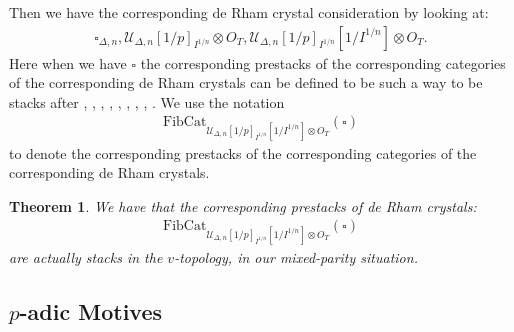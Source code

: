 \documentclass[12pt]{article}
\newtheorem{theorem}{Theorem}
\theoremstyle{definition}
\begin{document}
Then we have the corresponding de Rham crystal consideration by looking at:
\begin{align}
\square_{\Delta,n},\mathcal{U}_{\Delta,n}[1/p]_{I^{1/n}}\otimes {O}_T, \mathcal{U}_{\Delta,n}[1/p]_{I^{1/n}}[1/I^{1/n}]\otimes {O}_T. 
\end{align} 
Here when we have $\square$ the corresponding prestacks of the corresponding categories of the corresponding de Rham crystals can be defined to be such a way to be stacks after \cite{CSA}, \cite{CSB}, \cite{CSC}, \cite{SchD}, \cite{SALBRC}, \cite{TA}, \cite{TB}, \cite{TC}, \cite{BBBK}. We use the notation 
\begin{align}
\mathrm{FibCat}_{\mathcal{U}_{\Delta,n}[1/p]_{I^{1/n}}[1/I^{1/n}]\otimes {O}_T}(\square) 
\end{align}
to denote the corresponding prestacks of the corresponding categories of the corresponding de Rham crystals.
\begin{theorem}
We have that the corresponding prestacks of de Rham crystals:
\begin{align}
\mathrm{FibCat}_{\mathcal{U}_{\Delta,n}[1/p]_{I^{1/n}}[1/I^{1/n}]\otimes {O}_T}(\square) 
\end{align}
are actually stacks in the $v$-topology, in our mixed-parity situation. \end{theorem}


\subsection{$p$-adic Motives}
\end{document}
